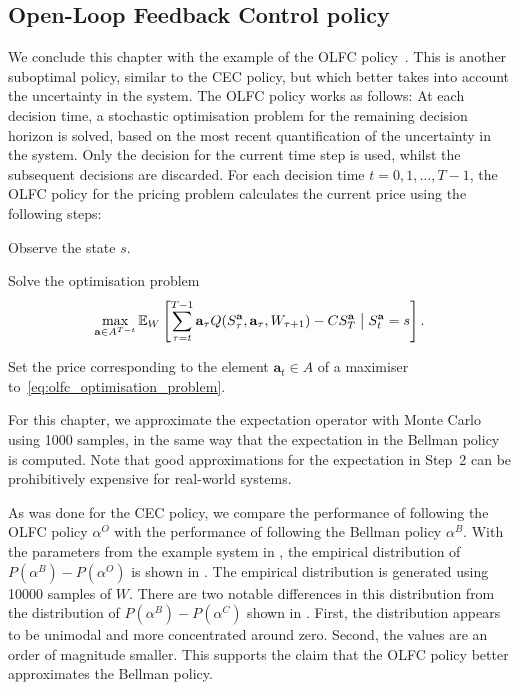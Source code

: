 \documentclass[main.tex]{subfiles}
\begin{document}
\subsection{Open-Loop Feedback Control policy}
We conclude this chapter with the example of the OLFC
policy~\citep[Ch.~6]{bertsekas2005dynamic}. This is another suboptimal policy,
similar to the CEC policy, but which better takes into account the uncertainty in the system.
The OLFC policy works as follows: At each decision time, a stochastic
optimisation problem for the remaining decision horizon is
solved, based on the most recent quantification of the uncertainty in the
system. Only the decision for the current time step is used, whilst
the subsequent decisions are discarded.
For each decision time $t=0,1,\dots,T-1$, the OLFC policy for the
pricing problem calculates the current price using the following steps:
\begin{enumerate}
  \begin{samepage}
  \item Observe the state $s$.
  \item Solve the optimisation problem
    \begin{equation}\label{eq:olfc_optimisation_problem}
      \max_{\mathbf{a}\in A^{T-t}}\mathbb{E}_W\left[
        \sum_{\tau=t}^{T-1}\mathbf{a}_\tau Q(S_\tau^{\mathbf{a}},\mathbf{a}_\tau
        ,W_{\tau+1})-CS_T^{\mathbf{a}} \bigm\vert S_t^{\mathbf{a}}=s \right].
    \end{equation}
  \item Set the price corresponding to the element
    $\mathbf{a}_t\in A$ of a maximiser
    to~\eqref{eq:olfc_optimisation_problem}.
  \end{samepage}
\end{enumerate}
For this chapter, we approximate the expectation operator with
Monte Carlo using \num{1000} samples, in the same way that the expectation
in the Bellman policy is computed.
Note that good approximations for the expectation in Step~2 can be
prohibitively expensive for real-world systems.

As was done for the CEC policy, we compare the performance of following the
OLFC policy $\alpha^O$ with the performance of following the Bellman
policy $\alpha^B$. With the parameters from the example system in
,
the empirical distribution of $P(\alpha^B)-P(\alpha^O)$ is shown in
. The empirical distribution is generated
using \num{10000} samples of $W$.
There are two notable differences in this distribution from the
distribution of $P(\alpha^B)-P(\alpha^C)$ shown in .
First, the distribution appears to be unimodal and more concentrated around zero. Second,
the values are an order of magnitude smaller.
This supports the claim that the OLFC policy better approximates the
Bellman policy.
\end{document}
